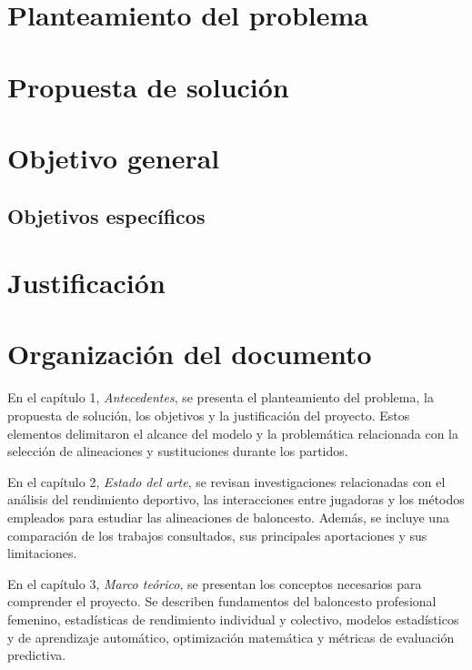 \documentclass[12pt,letterpaper]{report}
\begin{document}
\section{Planteamiento del problema}

\section{Propuesta de solución}


\section{Objetivo general}

\subsection{Objetivos específicos}


\section{Justificación}



\section{Organización del documento}
En el capítulo 1, \textit{Antecedentes}, se presenta el planteamiento del problema, la propuesta de solución, los objetivos y la justificación del proyecto. Estos elementos delimitaron el alcance del modelo y la problemática relacionada con la selección de alineaciones y sustituciones durante los partidos.

En el capítulo 2, \textit{Estado del arte}, se revisan investigaciones relacionadas con el análisis del rendimiento deportivo, las interacciones entre jugadoras y los métodos empleados para estudiar las alineaciones de baloncesto. Además, se incluye una comparación de los trabajos consultados, sus principales aportaciones y sus limitaciones.

En el capítulo 3, \textit{Marco teórico}, se presentan los conceptos necesarios para comprender el proyecto. Se describen fundamentos del baloncesto profesional femenino, estadísticas de rendimiento individual y colectivo, modelos estadísticos y de aprendizaje automático, optimización matemática y métricas de evaluación predictiva.
\end{document}
